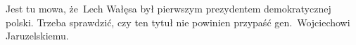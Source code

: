 \documentclass[a4paper,11pt]{article}
\begin{document}
\vspace{\spaceTwo}





\newpage
{}

\vspace{\spaceTwo} \vspace{\spaceThree}





\start {} Jest tu mowa, że~Lech Wałęsa był pierwszym
prezydentem demokratycznej polski. Trzeba sprawdzić, czy ten tytuł nie
powinien przypaść gen.~Wojciechowi Jaruzelskiemu.

\end{document}
